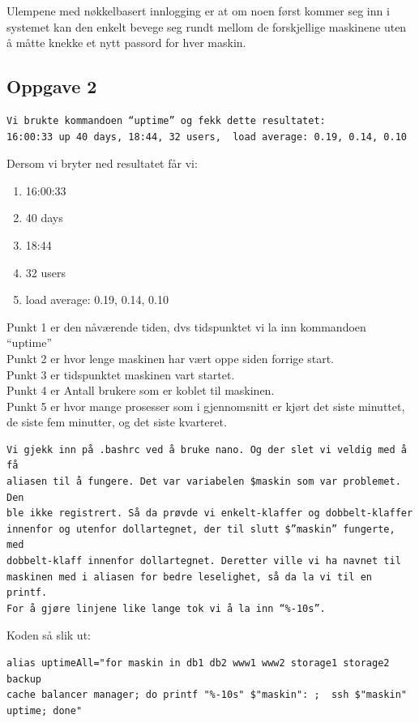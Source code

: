 \documentclass[a4paper, norsk, 12pt]{article}
\begin{document}
Ulempene med nøkkelbasert innlogging er at om noen først kommer seg inn i systemet kan den enkelt bevege seg rundt mellom de forskjellige maskinene uten å måtte knekke et nytt passord for hver maskin.

\subsection{Oppgave 2}
\begin{verbatim}
Vi brukte kommandoen “uptime” og fekk dette resultatet:
16:00:33 up 40 days, 18:44, 32 users,  load average: 0.19, 0.14, 0.10
\end{verbatim}

Dersom vi bryter ned resultatet får vi:\\
\begin{enumerate}
\item 16:00:33
\item 40 days
\item 18:44
\item 32 users
\item load average: 0.19, 0.14, 0.10
\end{enumerate}

Punkt 1 er den nåværende tiden, dvs tidspunktet vi la inn kommandoen “uptime”\\
Punkt 2 er hvor lenge maskinen har vært oppe siden forrige start.\\
Punkt 3 er tidspunktet maskinen vart startet.\\
Punkt 4 er Antall brukere som er koblet til maskinen.\\
Punkt 5 er hvor mange prosesser som i gjennomsnitt er kjørt det siste minuttet, de siste fem minutter, og det siste kvarteret.

\begin{verbatim}
Vi gjekk inn på .bashrc ved å bruke nano. Og der slet vi veldig med å få 
aliasen til å fungere. Det var variabelen $maskin som var problemet. Den 
ble ikke registrert. Så da prøvde vi enkelt-klaffer og dobbelt-klaffer 
innenfor og utenfor dollartegnet, der til slutt $”maskin” fungerte, med 
dobbelt-klaff innenfor dollartegnet. Deretter ville vi ha navnet til 
maskinen med i aliasen for bedre leselighet, så da la vi til en printf. 
For å gjøre linjene like lange tok vi å la inn “%-10s”.
\end{verbatim}

Koden så slik ut:
\begin{verbatim}
alias uptimeAll="for maskin in db1 db2 www1 www2 storage1 storage2 backup 
cache balancer manager; do printf "%-10s" $"maskin": ;  ssh $"maskin" 
uptime; done"
\end{verbatim}
\end{document}
